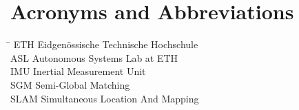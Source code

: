 \section*{Acronyms and Abbreviations}
\begin{tabbing}
 \hspace*{1.6cm}  \= \kill
 ETH \> Eidgenössische Technische Hochschule \\[0.5ex]
 ASL \> Autonomous Systems Lab at ETH \\[0.5ex]
 IMU \> Inertial Measurement Unit \\[0.5ex]
 SGM \> Semi-Global Matching \\[0.5ex]
 SLAM \> Simultaneous Location And Mapping \\[0.5ex]
\end{tabbing}
